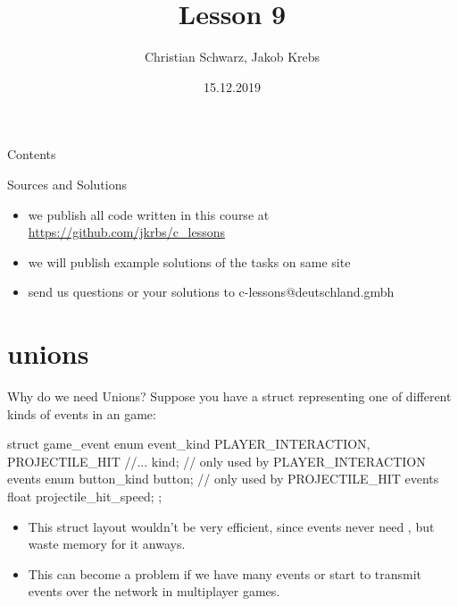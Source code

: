 \documentclass[10pt,graphics,aspectratio=169,table]{beamer}
\title{Lesson 9}
\author{Christian Schwarz, Jakob Krebs}
\date{15.12.2019}
\begin{document}
\maketitle

\begin{frame}{Contents}
    \tableofcontents
\end{frame}

\begin{frame}{Sources and Solutions}
    \begin{itemize}
        \item we publish all code written in this course at \url{https://github.com/jkrbs/c_lessons}
        \item we will publish example solutions of the tasks on same site
        \item send us questions or your solutions to c-lessons@deutschland.gmbh
    \end{itemize}
\end{frame}

\section{unions}
\begin{frame}[fragile]{Why do we need Unions?}
    Suppose you have a struct representing one of different kinds of 
    events in an game:
    \begin{codeblock}
struct game_event{
    enum event_kind {
        PLAYER_INTERACTION, PROJECTILE_HIT //...
    } kind;
    // only used by PLAYER_INTERACTION events   
    enum button_kind button; 
    // only used by PROJECTILE_HIT events
    float projectile_hit_speed; 
};
    \end{codeblock}

    \begin{itemize}
        \item This struct layout wouldn't be very efficient, since
         events never need ,
        but waste memory for it anways.
        \item This can become a problem if we have many events or start
        to transmit events over the network in multiplayer games.
    \end{itemize} 
 
\end{frame}
\end{document}
